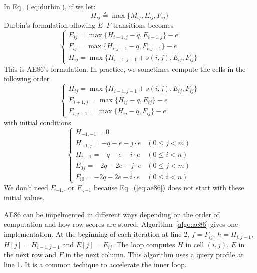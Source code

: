 \documentclass{bioinfo}
\begin{document}
\begin{methods}
In Eq.~(\ref{eq:durbin}), if we let:
\[H_{ij}\triangleq\max\{M_{ij},E_{ij},F_{ij}\}\]
Durbin's formulation allowing $E$--$F$ transitions becomes
\begin{equation}\label{eq:ae86-ori}
\left\{\begin{array}{l}
E_{ij}=\max\{H_{i-1,j}-q, E_{i-1,j}\} - e \\
F_{ij}=\max\{H_{i,j-1}-q, F_{i,j-1}\} - e \\
H_{ij}=\max\{H_{i-1,j-1}+s(i,j), E_{ij}, F_{ij}\}
\end{array}\right.
\end{equation}
This is AE86's formulation. In practice, we sometimes compute the cells in the
following order
\begin{equation}\label{eq:ae86}
\left\{\begin{array}{l}
H_{ij}=\max\{H_{i-1,j-1}+s(i,j), E_{ij}, F_{ij}\}\\
E_{i+1,j}=\max\{H_{ij}-q, E_{ij}\} - e \\
F_{i,j+1}=\max\{H_{ij}-q, F_{ij}\} - e
\end{array}\right.
\end{equation}
with initial conditions
\begin{equation}
\left\{\begin{array}{ll}
H_{-1,-1}=0\\
H_{-1,j}=-q-e-j\cdot e & (0\le j<m)\\
H_{i,-1}=-q-e-i\cdot e & (0\le i<n)\\
E_{0j}=-2q-2e-j\cdot e & (0\le j<m)\\
F_{i0}=-2q-2e-i\cdot e & (0\le i<n)
\end{array}\right.
\end{equation}
We don't need $E_{-1,\cdot}$ or $F_{\cdot,-1}$ because Eq.~(\ref{eq:ae86})
does not start with these initial values.

AE86 can be impelmented in different ways depending on the order of computation
and how row scores are stored. Algorithm~\ref{algo:ae86} gives one
implementation. At the beginning of each iteration at line 2, $f=F_{ij}$,
$h=H_{i,j-1}$, $H[j]=H_{i-1,j-1}$ and $E[j]=E_{ij}$. The loop computes
$H$ in cell $(i,j)$, $E$ in the next row and $F$ in the next column.
This algorithm uses a query profile at line 1. It is a common techique
to accelerate the inner loop.


\end{methods}
\end{document}
